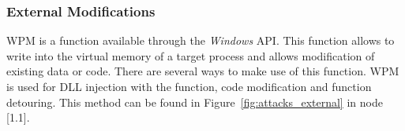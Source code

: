 \subsubsection{ External Modifications}
\gls{WPM} is a function available through the \emph{Windows} \gls{API}. This function allows to write into the virtual memory of a target process and allows modification of existing data or code. There are several ways to make use of this function. \gls{WPM} is used for \gls{DLL} injection with the  function, code modification and function detouring. This method can be found in Figure~\ref{fig:attacks_external} in node [1.1].


